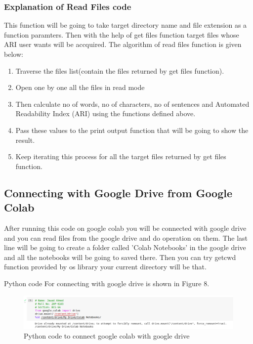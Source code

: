 \documentclass{article}
\begin{document}
\subsubsection{Explanation of Read Files code}

This function will be going to take target directory name and file extension as a function paramters. Then with the help of get files function target files whose ARI user wants will be accquired. The algorithm of read files function is given below:

\begin{enumerate}
  \item Traverse the files list(contain the files returned by get files function).
  \item Open one by one all the files in read mode
  \item Then calculate no of words, no of characters, no of sentences and Automated Readability Index (ARI) using the functions defined above.
  \item Pass these values to the print output function that will be going to show the result.
  \item Keep iterating this process for all the target files returned by get files function.
\end{enumerate}



\subsection{Connecting with Google Drive from Google Colab}

After running this code on google colab you will be connected with google drive and you can read files from the google drive and do operation on them. The last line will be going to create a folder called 'Colab Notebooks' in the google drive and all the notebooks will be going to saved there. Then you can try getcwd function provided by os library your current directory will be that. 


Python code For connecting with google drive is shown in Figure 8.

\begin{figure}
\centering
\includegraphics[scale=0.2]{screenshots/ai_a1-8.png}
\caption{\label{fig:python_code_read_files}Python code to connect google colab with google drive}
\end{figure}
\end{document}
